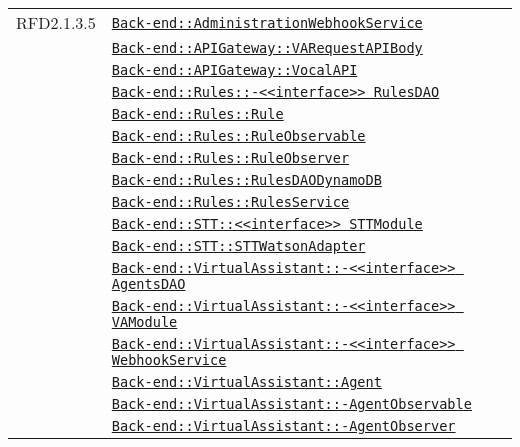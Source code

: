 \begin{longtable}{|>{\centering}m{3cm}|m{10cm}<{\centering}|}
RFD2.1.3.5 & \hyperref[Back-end::AdministrationWebhookService]{\texttt{Back-end::AdministrationWebhookService}}\\
& \hyperref[Back-end::APIGateway::VARequestAPIBody]{\texttt{Back-end::APIGateway::VARequestAPIBody}}\\
& \hyperref[Back-end::APIGateway::VocalAPI]{\texttt{Back-end::APIGateway::VocalAPI}}\\
& \hyperref[Back-end::Rules::<<interface>> RulesDAO]{\texttt{Back-end::Rules::-\linebreak <<interface>> RulesDAO}}\\
& \hyperref[Back-end::Rules::Rule]{\texttt{Back-end::Rules::Rule}}\\
& \hyperref[Back-end::Rules::RuleObservable]{\texttt{Back-end::Rules::RuleObservable}}\\
& \hyperref[Back-end::Rules::RuleObserver]{\texttt{Back-end::Rules::RuleObserver}}\\
& \hyperref[Back-end::Rules::RulesDAODynamoDB]{\texttt{Back-end::Rules::RulesDAODynamoDB}}\\
& \hyperref[Back-end::Rules::RulesService]{\texttt{Back-end::Rules::RulesService}}\\
& \hyperref[Back-end::STT::<<interface>> STTModule]{\texttt{Back-end::STT::<<interface>> STTModule}}\\
& \hyperref[Back-end::STT::STTWatsonAdapter]{\texttt{Back-end::STT::STTWatsonAdapter}}\\
& \hyperref[Back-end::VirtualAssistant::<<interface>> AgentsDAO]{\texttt{Back-end::VirtualAssistant::-\linebreak <<interface>> AgentsDAO}}\\
& \hyperref[Back-end::VirtualAssistant::<<interface>> VAModule]{\texttt{Back-end::VirtualAssistant::-\linebreak <<interface>> VAModule}}\\
& \hyperref[Back-end::VirtualAssistant::<<interface>> WebhookService]{\texttt{Back-end::VirtualAssistant::-\linebreak <<interface>> WebhookService}}\\
& \hyperref[Back-end::VirtualAssistant::Agent]{\texttt{Back-end::VirtualAssistant::Agent}}\\
& \hyperref[Back-end::VirtualAssistant::AgentObservable]{\texttt{Back-end::VirtualAssistant::-\linebreak AgentObservable}}\\
& \hyperref[Back-end::VirtualAssistant::AgentObserver]{\texttt{Back-end::VirtualAssistant::-\linebreak AgentObserver}}\\

\end{longtable}
